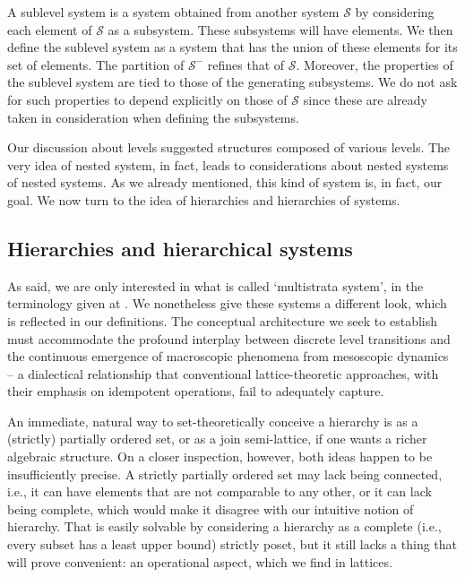 A sublevel system is a system obtained from another system $\mathcal{S}$ by considering each element of $\mathcal{S}$ as a subsystem. These subsystems will have elements. We then define the sublevel system as a system that has the union of these elements for its set of elements. The partition of $\mathcal{S}^-$ refines that of $\mathcal{S}$. Moreover, the properties of the sublevel system are tied to those of the generating subsystems. We do not ask for such properties to depend explicitly on those of $\mathcal{S}$ since these are already taken in consideration when defining the subsystems.

Our discussion about levels suggested structures composed of various levels. The very idea of nested system, in fact, leads to considerations about nested systems of nested systems. As we already mentioned, this kind of system is, in fact, our goal. We now turn to the idea of hierarchies and hierarchies of systems.

\subsection{Hierarchies and hierarchical systems}

As said, we are only interested in what is called `multistrata system', in the terminology given at \cite{Mesarovic1970}. We nonetheless give these systems a different look, which is reflected in our definitions. The conceptual architecture we seek to establish must accommodate the profound interplay between discrete level transitions and the continuous emergence of macroscopic phenomena from mesoscopic dynamics -- a dialectical relationship that conventional lattice-theoretic approaches, with their emphasis on idempotent operations, fail to adequately capture.

An immediate, natural way to set-theoretically conceive a hierarchy is as a (strictly) partially ordered set, or as a join semi-lattice, if one wants a richer algebraic structure. On a closer inspection, however, both ideas happen to be insufficiently precise. A strictly partially ordered set may lack being connected, i.e., it can have elements that are not comparable to any other, or it can lack being complete, which would make it disagree with our intuitive notion of hierarchy. That is easily solvable by considering a hierarchy as a complete (i.e., every subset has a least upper bound) strictly poset, but it still lacks a thing that will prove convenient: an operational aspect, which we find in lattices. 

